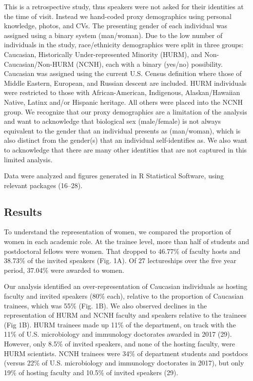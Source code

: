 \documentclass[10pt,]{article}
\begin{document}
This is a retrospective study, thus speakers were not asked for their
identities at the time of visit. Instead we hand-coded proxy
demographics using personal knowledge, photos, and CVs. The presenting
gender of each individual was assigned using a binary system
(man/woman). Due to the low number of individuals in the study,
race/ethnicity demographics were split in three groups: Caucasian,
Historically Under-represented Minority (HURM), and
Non-Caucasian/Non-HURM (NCNH), each with a binary (yes/no) possibility.
Caucasian was assigned using the current U.S. Census definition where
those of Middle Eastern, European, and Russian descent are included.
HURM individuals were restricted to those with African-American,
Indigenous, Alaskan/Hawaiian Native, Latinx and/or Hispanic heritage.
All others were placed into the NCNH group. We recognize that our proxy
demographics are a limitation of the analysis and want to acknowledge
that biological sex (male/female) is not always equivalent to the gender
that an individual presents as (man/woman), which is also distinct from
the gender(s) that an individual self-identifies as. We also want to
acknowledge that there are many other identities that are not captured
in this limited analysis.

Data were analyzed and figures generated in R Statistical Software,
using relevant packages (16--28).

\subsection{Results}\label{results}

To understand the representation of women, we compared the proportion of
women in each academic role. At the trainee level, more than half of
students and postdoctoral fellows were women. That dropped to 46.77\% of
faculty hosts and 38.73\% of the invited speakers (Fig. 1A). Of 27
lectureships over the five year period, 37.04\% were awarded to women.

Our analysis identified an over-representation of Caucasian individuals
as hosting faculty and invited speakers (80\% each), relative to the
proportion of Caucasian trainees, which was 55\% (Fig. 1B). We also
observed declines in the representation of HURM and NCNH faculty and
speakers relative to the trainees (Fig 1B). HURM trainees made up 11\%
of the department, on track with the 11\% of U.S. microbiology and
immunology doctorates awarded in 2017 (29). However, only 8.5\% of
invited speakers, and none of the hosting faculty, were HURM scientists.
NCNH trainees were 34\% of department students and postdocs (versus 22\%
of U.S. microbiology and immunology doctorates in 2017), but only 19\%
of hosting faculty and 10.5\% of invited speakers (29).
\end{document}
